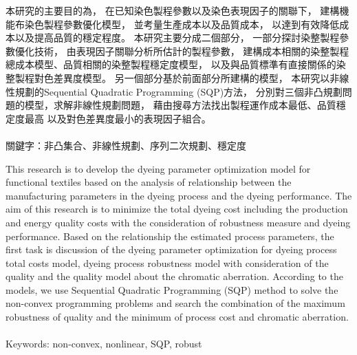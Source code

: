 \begin{abstractzh}
本研究的主要目的為，
在已知染色製程參數以及染色表現因子的關聯下，
建構機能布染色製程參數優化模型，
並考量生產成本以及品質成本，
以達到有效降低成本以及提高品質的穩定程度。
本研究主要分成二個部分，
一部分探討染整製程參數優化技術，
由表現因子關聯分析所估計的製程參數，
建構成本相關的染整製程總成本模型、品質相關的染整製程穩定度模型，
以及與品質標準有直接關係的染整製程對色差異度模型。
另一個部分基於前面部分所建構的模型，
本研究以非線性規劃的Sequential Quadratic Programming (SQP)方法，
分別對三個非凸規劃問題的模型，求解非線性規劃問題，
藉由搜尋方法找出製程運作成本最低、品質穩定度最高
以及對色差異度最小的表現因子組合。
\\ \\關鍵字：非凸集合、非線性規劃、序列二次規劃、穩定度
\end{abstractzh}

\begin{abstracten}
This research is to develop the dyeing parameter optimization model for functional textiles based on the analysis of relationship between the manufacturing parameters in the dyeing process and the dyeing performance. The aim of this research is to minimize the total dyeing cost including the production and energy quality costs with the consideration of robustness measure and dyeing performance.
Based on the relationship the estimated process parameters, the first task is discussion of the dyeing parameter optimization for dyeing process total costs model, dyeing process robustness model with consideration of the quality and the quality model about the chromatic aberration. 
According to the models, we use Sequential Quadratic Programming (SQP) method to solve the non-convex programming problems and search the combination of the maximum robustness of quality and the minimum of process cost and chromatic aberration. 
\\ \\Keywords: non-convex, nonlinear, SQP, robust
\end{abstracten}